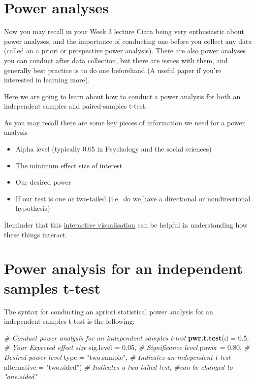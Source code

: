 \documentclass[
]{book}
\newenvironment{Shaded}{\begin{snugshade}}{\end{snugshade}}
\newcommand{\AttributeTok}[1]{\textcolor[rgb]{0.13,0.29,0.53}{#1}}
\newcommand{\CommentTok}[1]{\textcolor[rgb]{0.56,0.35,0.01}{\textit{#1}}}
\newcommand{\FloatTok}[1]{\textcolor[rgb]{0.00,0.00,0.81}{#1}}
\newcommand{\FunctionTok}[1]{\textcolor[rgb]{0.13,0.29,0.53}{\textbf{#1}}}
\newcommand{\NormalTok}[1]{#1}
\newcommand{\StringTok}[1]{\textcolor[rgb]{0.31,0.60,0.02}{#1}}
\begin{document}
\section{Power analyses}\label{power-analyses}

Now you may recall in your Week 3 lecture Ciara being very enthusiastic about power analyses, and the importance of conducting one before you collect any data (called an a priori or prospective power analysis). There are also power analyses you can conduct after data collection, but there are issues with them, and generally best practice is to do one beforehand (A useful paper if you're interested in learning more).

Here we are going to learn about how to conduct a power analysis for both an independent samples and paired-samples t-test.

As you may recall there are some key pieces of information we need for a power analysis

\begin{itemize}
\item
  Alpha level (typically 0.05 in Psychology and the social sciences)
\item
  The minimum effect size of interest
\item
  Our desired power
\item
  If our test is one or two-tailed (i.e.~do we have a directional or nondirectional hypothesis)
\end{itemize}

Reminder that this \href{https://rpsychologist.com/d3/nhst/}{interactive visualisation} can be helpful in understanding how these things interact.

\section{Power analysis for an independent samples t-test}\label{power-analysis-for-an-independent-samples-t-test}

The syntax for conducting an apriori statistical power analysis for an independent samples t-test is the following:

\begin{Shaded}
\begin{Highlighting}[]
\CommentTok{\# Conduct power analysis for an independent samples t{-}test}
\FunctionTok{pwr.t.test}\NormalTok{(}\AttributeTok{d =} \FloatTok{0.5}\NormalTok{,         }\CommentTok{\# Your Expected effect size}
           \AttributeTok{sig.level =} \FloatTok{0.05}\NormalTok{, }\CommentTok{\# Significance level}
           \AttributeTok{power =} \FloatTok{0.80}\NormalTok{,     }\CommentTok{\# Desired power level}
           \AttributeTok{type =} \StringTok{"two.sample"}\NormalTok{,  }\CommentTok{\# Indicates an independent t{-}test}
           \AttributeTok{alternative =} \StringTok{"two.sided"}\NormalTok{)  }\CommentTok{\# Indicates a two{-}tailed test, \#can be changed to "one.sided"}
\end{Highlighting}
\end{Shaded}
\end{document}
